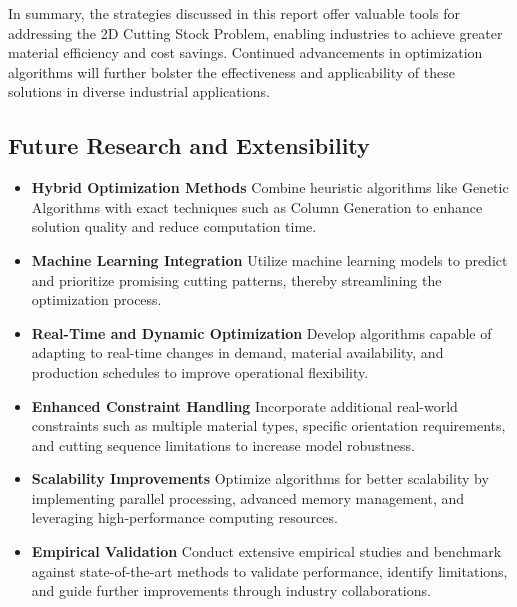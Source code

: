 \documentclass[a4paper]{article}
\begin{document}
\vspace{0.4cm}

\noindent In summary, the strategies discussed in this report offer valuable tools for addressing the 2D Cutting Stock Problem, enabling industries to achieve greater material efficiency and cost savings. Continued advancements in optimization algorithms will further bolster the effectiveness and applicability of these solutions in diverse industrial applications.
\subsection{Future Research and Extensibility}

\begin{itemize}

    \item \textbf{Hybrid Optimization Methods} Combine heuristic algorithms like Genetic Algorithms with exact techniques such as Column Generation to enhance solution quality and reduce computation time.
    
    \item \textbf{Machine Learning Integration} Utilize machine learning models to predict and prioritize promising cutting patterns, thereby streamlining the optimization process.
    
    \item \textbf{Real-Time and Dynamic Optimization} Develop algorithms capable of adapting to real-time changes in demand, material availability, and production schedules to improve operational flexibility.
    
    \item \textbf{Enhanced Constraint Handling} Incorporate additional real-world constraints such as multiple material types, specific orientation requirements, and cutting sequence limitations to increase model robustness.
    \item \textbf{Scalability Improvements} Optimize algorithms for better scalability by implementing parallel processing, advanced memory management, and leveraging high-performance computing resources.

    
    \item \textbf{Empirical Validation} Conduct extensive empirical studies and benchmark against state-of-the-art methods to validate performance, identify limitations, and guide further improvements through industry collaborations.

\end{itemize}
\newpage
\end{document}

